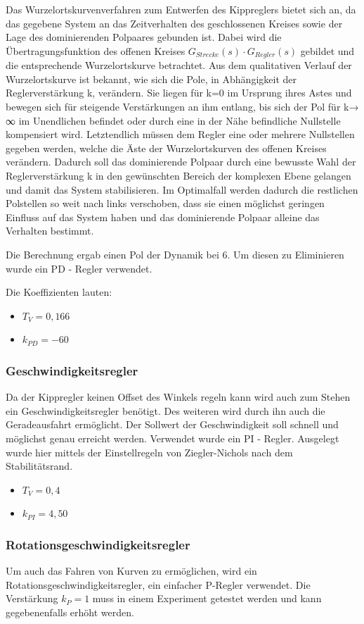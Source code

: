 Das Wurzelortskurvenverfahren zum Entwerfen des Kippreglers bietet sich an, da das gegebene System an das Zeitverhalten des geschlossenen Kreises sowie der Lage des dominierenden Polpaares gebunden ist.  Dabei wird die Übertragungsfunktion des offenen Kreises $G_{Strecke}(s)\cdot G_{Regler}(s)$ gebildet und die entsprechende Wurzelortskurve betrachtet. Aus dem qualitativen Verlauf der Wurzelortskurve ist bekannt, wie sich die Pole, in Abhängigkeit der Reglerverstärkung k, verändern. Sie liegen für k=0 im Ursprung ihres Astes und bewegen sich für steigende Verstärkungen an ihm entlang, bis sich der Pol für k→ ∞ im Unendlichen befindet oder durch eine in der Nähe befindliche Nullstelle kompensiert wird. Letztendlich müssen dem Regler eine oder mehrere Nullstellen gegeben werden, welche die Äste der Wurzelortskurven des offenen Kreises verändern. Dadurch soll das dominierende Polpaar durch eine bewusste Wahl der Reglerverstärkung k in den gewünschten Bereich der komplexen Ebene gelangen und damit das System stabilisieren. Im Optimalfall werden dadurch die restlichen Polstellen so weit nach links verschoben, dass sie einen möglichst geringen Einfluss auf das System haben und das dominierende Polpaar alleine das Verhalten bestimmt.

Die Berechnung ergab einen Pol der Dynamik bei $6$. Um diesen zu Eliminieren wurde ein PD - Regler verwendet.

Die Koeffizienten lauten:
\begin{itemize}
	\item $ T_{V}=0,166$
	\item $ k_{PD}=-60$
\end{itemize}
\subsubsection{Geschwindigkeitsregler}
Da der Kippregler keinen Offset des Winkels regeln kann wird auch zum Stehen ein Geschwindigkeitsregler benötigt. Des weiteren wird durch ihn auch die Geradeausfahrt ermöglicht. Der Sollwert der Geschwindigkeit soll schnell und möglichst genau erreicht werden.
Verwendet wurde ein PI - Regler. Ausgelegt wurde hier mittels der Einstellregeln von Ziegler-Nichols nach dem Stabilitätsrand.
\begin{itemize}
	\item $ T_{V}=0,4$
	\item $ k_{PI}=4,50$
\end{itemize}
\subsubsection{Rotationsgeschwindigkeitsregler}
Um auch das Fahren von Kurven zu ermöglichen, wird ein Rotationsgeschwindigkeitsregler, ein einfacher P-Regler verwendet. Die Verstärkung $k_{P}=1$ muss in einem Experiment getestet werden und kann gegebenenfalls erhöht werden.
